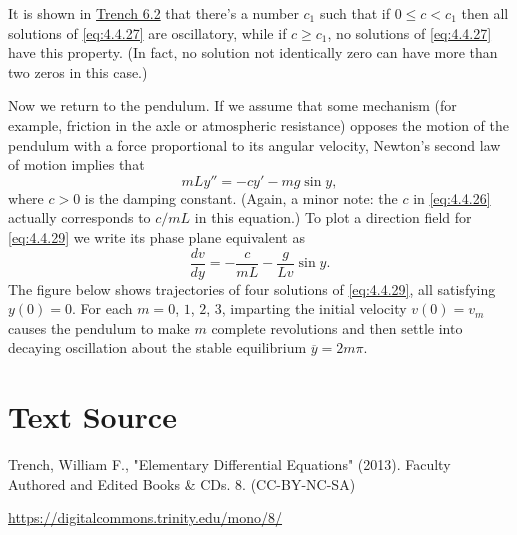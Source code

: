 \documentclass{ximera}
\begin{document}
 
It is shown in \href{https://ximera.osu.edu/ode/main/springProblemsII/springProblemsII}{Trench 6.2} that there's a number $c_1$ such that if $0\leq
c<c_1$ then  all solutions of \eqref{eq:4.4.27} are oscillatory, while if
$c\geq c_1$,  no solutions of \eqref{eq:4.4.27} have this property. (In
fact, no solution not identically zero can have more than two zeros in
this case.) 
 
 
 
\begin{example}\label{example:4.4.5}
Now we
return to the pendulum. If we assume that
some mechanism (for example, friction in the axle or atmospheric
resistance) opposes the motion of the pendulum with a force
proportional to its angular velocity,  Newton's second law of
motion implies that
\begin{equation} \label{eq:4.4.29}
mLy''=-cy'-mg\sin y,
\end{equation}
where $c>0$ is the damping constant. (Again, a minor note: the $c$
in \eqref{eq:4.4.26} actually corresponds to $c/mL$ in this equation.)
To plot a direction field for \eqref{eq:4.4.29} we write its phase plane
equivalent as
$$
\frac{dv}{dy}=-\frac{c}{mL}-\frac{g}{Lv}\sin y.
$$
The figure below shows
trajectories of four solutions of \eqref{eq:4.4.29}, all satisfying
$y(0)=0$. For each $m=0$, $1$, $2$, $3$, imparting the initial velocity
$v(0)=v_m$ causes the pendulum to make $m$ complete revolutions and
then settle into decaying oscillation about the stable equilibrium
$\overline{y}=2m\pi$.

\begin{center}
\end{center}
 
 
 
\end{example}
 
 
 
 
 
 
\section*{Text Source}
Trench, William F., "Elementary Differential Equations" (2013). Faculty Authored and Edited Books \& CDs. 8. (CC-BY-NC-SA)
 
\href{https://digitalcommons.trinity.edu/mono/8/}{https://digitalcommons.trinity.edu/mono/8/}
 
 
\end{document}
